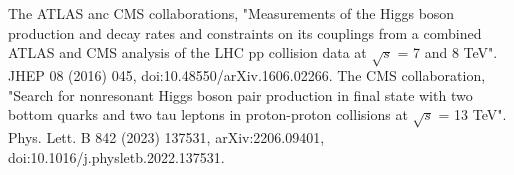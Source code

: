 \begin{thebibliography}{1}
The ATLAS anc CMS collaborations, "Measurements of the Higgs boson production and decay rates and constraints on its couplings from a combined ATLAS and CMS analysis of the LHC pp collision data at $\sqrt{s}$ = 7 and 8 TeV". JHEP 08 (2016) 045, 
doi:10.48550/arXiv.1606.02266.
The CMS collaboration, "Search for nonresonant Higgs boson pair production in final state with two bottom quarks and two tau leptons in proton-proton collisions at $\sqrt{s}$ = 13 TeV". Phys. Lett. B 842 (2023) 137531, arXiv:2206.09401, 
doi:10.1016/j.physletb.2022.137531.

\end{thebibliography}